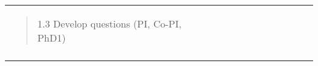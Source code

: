 \begin{longtable}[]{@{}lllllllllll@{}}
\begin{minipage}[t]{0.07\columnwidth}
\begin{quote}
1.3 Develop questions (PI, Co-PI, PhD1) \end{quote}\strut \end{minipage} & \begin{minipage}[t]{0.07\columnwidth}\raggedright \strut \end{minipage} & \begin{minipage}[t]{0.07\columnwidth}\raggedright \strut \end{minipage} & \begin{minipage}[t]{0.07\columnwidth}\raggedright \strut \end{minipage} & \begin{minipage}[t]{0.07\columnwidth}\raggedright \strut \end{minipage} & \begin{minipage}[t]{0.07\columnwidth}\raggedright \strut \end{minipage} & \begin{minipage}[t]{0.07\columnwidth}\raggedright \strut \end{minipage} & \begin{minipage}[t]{0.07\columnwidth}\raggedright \strut \end{minipage} & \begin{minipage}[t]{0.07\columnwidth}\raggedright \strut \end{minipage} & \begin{minipage}[t]{0.07\columnwidth}\raggedright \strut \end{minipage} & \begin{minipage}[t]{0.07\columnwidth}\raggedright \strut \end{minipage}\tabularnewline \begin{minipage}[t]{0.07\columnwidth}\raggedright \strut \end{minipage} & \begin{minipage}[t]{0.07\columnwidth}\raggedright \strut \end{minipage} & \begin{minipage}[t]{0.07\columnwidth}\raggedright \strut \end{minipage} & \begin{minipage}[t]{0.07\columnwidth}\raggedright \strut \end{minipage} & \begin{minipage}[t]{0.07\columnwidth}\raggedright \strut \end{minipage} & \begin{minipage}[t]{0.07\columnwidth}\raggedright \strut \end{minipage} & \begin{minipage}[t]{0.07\columnwidth}\raggedright \strut \end{minipage} & \begin{minipage}[t]{0.07\columnwidth}\raggedright \strut \end{minipage} & \begin{minipage}[t]{0.07\columnwidth}\raggedright \strut \end{minipage} & 
\end{quote}
\end{minipage}
\end{longtable}
